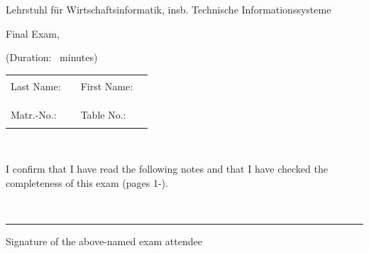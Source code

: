 \thispagestyle{empty}


\hfill
\begin{minipage}[b]{0.7\textwidth}
\end{minipage}
\begin{flushright}
Lehrstuhl f{\"u}r Wirtschaftsinformatik, insb. Technische Informationssysteme
\end{flushright}
\begin{flushright}
\vspace{0.5cm}\klausurdatum
\end{flushright}

\enlargethispage{3em}

{\Large
\begin{center}
Final Exam, \klausursemester
	
	\textbf{\klausurname} 
	
	(Duration: \klausurminuten \ minutes)
\end{center}
}

{\large
\vspace{1cm}
\begin{tabular}{llll}
Last Name: & \rule{4cm}{1pt} & First Name: & \rule{4.5cm}{1pt}  \\
&&& \\
Matr.-No.: & \rule{4cm}{1pt} & Table No.: & \rule{4.5cm}{1pt} \\
\end{tabular}
}

~\vspace{0.0cm}

I confirm that I have read the following notes and that I have checked the com\-plete\-ness
of this exam (pages 1-\pageref{LastPage}).

~\vspace{0.5cm}

\begin{flushright}
\begin{minipage}{8cm}
\rule{\textwidth}{0.5pt}
Signature of the above-named exam attendee
\end{minipage}
\end{flushright}

